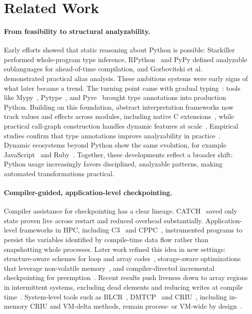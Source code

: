 \section{Related Work}
\label{sec:related}

\paragraph{From feasibility to structural analyzability.}
Early efforts showed that static reasoning about Python is possible: Starkiller~\cite{salib2004starkiller} performed whole-program type inference, RPython~\cite{ancona2007rpython} and PyPy defined analyzable sublanguages for ahead-of-time compilation, and Gorbovitski et al.~\cite{gorbovitski2010alias} demonstrated practical alias analysis. These ambitious systems were early signs of what later became a trend. The turning point came with gradual typing~\cite{siek2007gradual,vitousek2014design}: tools like Mypy~\cite{mypy}, Pytype~\cite{pytype}, and Pyre~\cite{pyre} brought type annotations into production Python. Building on this foundation, abstract interpretation frameworks now track values and effects across modules, including native C extensions~\cite{fromherz2018static,monat2021static,monat2021multilanguage}, while practical call-graph construction handles dynamic features at scale~\cite{salis2021pycg,rakamnouykit2024potohybridandersenspointsto}. Empirical studies confirm that type annotations improve analyzability in practice~\cite{bence2021unambiguity}. Dynamic ecosystems beyond Python show the same evolution, for example JavaScript~\cite{jensen2009type,kashyap2014jsai} and Ruby~\cite{furr2009static,kazerounian2021simtyper}. Together, these developments reflect a broader shift: Python usage increasingly favors disciplined, analyzable patterns, making automated transformations practical.

\paragraph{Compiler-guided, application-level checkpointing.}
Compiler assistance for checkpointing has a clear lineage. CATCH~\cite{li1990catch} saved only state proven live across restart and reduced overhead substantially. Application-level frameworks in HPC, including C3~\cite{bronevetsky2004application} and CPPC~\cite{rodriguez2010cppc}, instrumented programs to persist the variables identified by compile-time data flow rather than snapshotting whole processes. Later work refined this idea in new settings: structure-aware schemes for loop and array codes~\cite{elnawawy2017efficient}, storage-aware optimizations that leverage non-volatile memory~\cite{kannan2013optimizing}, and compiler-directed incremental checkpointing for preemption~\cite{ji2022compiler}. Recent results push liveness down to array regions in intermittent systems, excluding dead elements and reducing writes at compile time~\cite{kim2024lact}. System-level tools such as BLCR~\cite{hargrove2006berkeley}, DMTCP~\cite{AnselAryaCooperman2009DMTCP} and CRIU~\cite{corbet2011checkpoint}, including in-memory CRIU and VM-delta methods, remain process- or VM-wide by design~\cite{venkatesh2019fast,MoshikSOCC22}.

